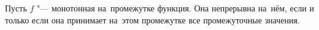 
    Пусть $f$ "--- монотонная на~промежутке функция. Она непрерывна на~нём, если и только если она принимает на~этом промежутке все промежуточные значения.
